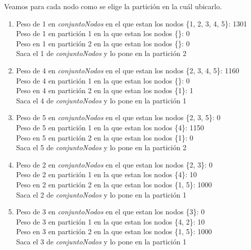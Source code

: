 Veamos para cada nodo como se elige la partición en la cuál ubicarlo.

\begin{enumerate}

\item
Peso de 1 en \textit{conjuntoNodos} en el que estan los nodos \{1, 2, 3, 4, 5\}: 1301\\
Peso de 1 en partición 1 en la que estan los nodos \{\}: 0 \\
Peso en 1 en partición 2 en la que estan los nodos \{\}: 0 \\

Saca el 1 de \textit{conjuntoNodos} y lo pone en la partición 2\\

\item
Peso de 4 en \textit{conjuntoNodos} en el que estan los nodos \{2, 3, 4, 5\}: 1160\\
Peso de 4 en partición 1 en la que estan los nodos \{\}: 0 \\
Peso en 4 en partición 2 en la que estan los nodos \{1\}: 1 \\

Saca el 4 de \textit{conjuntoNodos} y lo pone en la partición 1\\

\item
Peso de 5 en \textit{conjuntoNodos} en el que estan los nodos \{2, 3, 5\}: 0\\
Peso de 5 en partición 1 en la que estan los nodos \{4\}: 1150 \\
Peso en 5 en partición 2 en la que estan los nodos \{1\}: 0 \\

Saca el 5 de \textit{conjuntoNodos} y lo pone en la partición 2\\

\item
Peso de 2 en \textit{conjuntoNodos} en el que estan los nodos \{2, 3\}: 0\\
Peso de 2 en partición 1 en la que estan los nodos \{4\}: 10 \\
Peso en 2 en partición 2 en la que estan los nodos \{1, 5\}: 1000 \\

Saca el 2 de \textit{conjuntoNodos} y lo pone en la partición 1\\

\item
Peso de 3 en \textit{conjuntoNodos} en el que estan los nodos \{3\}: 0\\
Peso de 3 en partición 1 en la que estan los nodos \{4, 2\}: 10 \\
Peso en 3 en partición 2 en la que estan los nodos \{1, 5\}: 1000 \\

Saca el 3 de \textit{conjuntoNodos} y lo pone en la partición 1\\
\end{enumerate}

